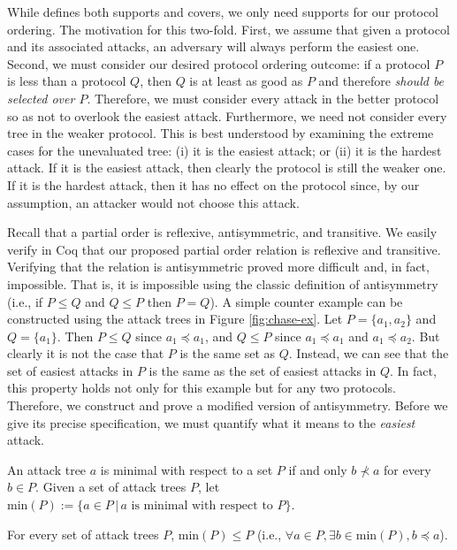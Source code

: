 \documentclass[runningheads]{llncs}
\theoremstyle{definition}
\begin{document}
While \citeauthor{Rowe:2021:OnOrdering} defines both supports and
covers, we only need supports for our protocol ordering. The
motivation for this two-fold. First, we assume that given a protocol
and its associated attacks, an adversary will always perform the
easiest one.  Second, we must consider our desired protocol ordering
outcome: if a protocol $P$ is less than a protocol $Q$, then $Q$ is at
least as good as $P$ and therefore \emph{should be selected over
  $P$}. Therefore, we must consider every attack in the better
protocol so as not to overlook the easiest attack. Furthermore, we
need not consider every tree in the weaker protocol. This is best
understood by examining the extreme cases for the unevaluated tree:
(i) it is the easiest attack; or (ii) it is the hardest attack. If it
is the easiest attack, then clearly the protocol is still the weaker
one. If it is the hardest attack, then it has no effect on the
protocol since, by our assumption, an attacker would not choose this
attack.

Recall that a partial order is reflexive, antisymmetric, and
transitive. We easily verify in Coq that our proposed partial order
relation is reflexive and transitive. Verifying that the relation is
antisymmetric proved more difficult and, in fact, impossible. That is,
it is impossible using the classic definition of antisymmetry (i.e.,
if $P \le Q$ and $Q \le P$ then $P = Q$). A simple counter example can
be constructed using the attack trees in Figure
\ref{fig:chase-ex}. Let $P = \{a_1,a_2\}$ and $Q = \{a_1\}$. Then $P
\le Q$ since $a_1 \preceq a_1$, and $Q \le P$ since $a_1 \preceq a_1$
and $a_1 \preceq a_2$. But clearly it is not the case that $P$ is the
same set as $Q$. Instead, we can see that the set of easiest attacks
in $P$ is the same as the set of easiest attacks in $Q$. In fact, this
property holds not only for this example but for any two
protocols. Therefore, we construct and prove a modified version of
antisymmetry. Before we give its precise specification, we must
quantify what it means to the \emph{easiest} attack. 

\begin{definition}
  An attack tree $a$ is minimal with respect to a set $P$ if and only
  $b \nprec a$ for every $b \in P$. Given a set of attack trees $P$,
  let $\text{min}(P) := \{a \in P \,|\, a \text{ is minimal with
    respect to } P \}$. 
\end{definition}

\begin{lemma}
  For every set of attack trees $P$, $\text{min}(P) \le P$ (i.e.,
  $\forall a \in P, \exists b \in \text{min}(P), b \preceq a$). 
\end{lemma}
\end{document}
